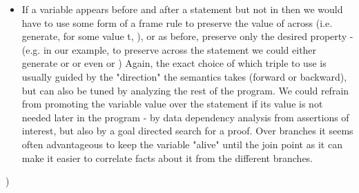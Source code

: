 \begin{itemize}
		\item If a variable  appears before and after a statement  but not in  then we would have to use some form of a frame rule to preserve the value of  across  (i.e. generate, for some value t, ), or as before, preserve only the desired property - (e.g. in our example, to preserve  across the statement  we could either generate   or  or even  or )
		Again, the exact choice of which triple to use is usually guided by the "direction" the semantics takes (forward or backward), but can also be tuned by analyzing the rest of the program.
		We could refrain from promoting the variable value over the statement if its value is not needed later in the program - by data dependency analysis from assertions of interest, but also by a goal directed search for a proof.
		Over branches it seems often advantageous to keep the variable "alive" until the join point as it can make it easier to correlate facts about it from the different branches.
		
\end{itemize})
